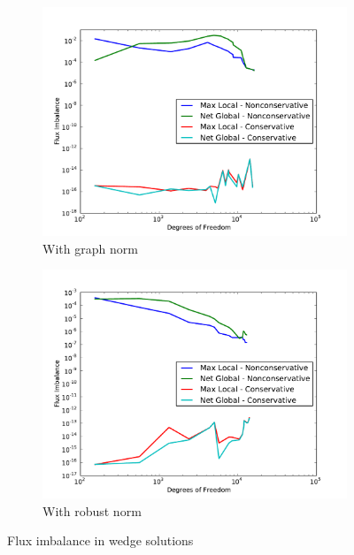 \documentclass[letterpaper]{article}
\begin{document}
\begin{figure}
\centering
\begin{subfigure}[t]{0.45\textwidth}
\centering
\includegraphics[width=\textwidth]{figs/Wedge/graphFlux.pdf}
\caption{With graph norm}
\label{fig:wedgeGraphFlux}
\end{subfigure}
\begin{subfigure}[t]{0.45\textwidth}
\centering
\includegraphics[width=\textwidth]{figs/Wedge/robustFlux.pdf}
\caption{With robust norm}
\label{fig:wedgeRobustFlux}
\end{subfigure}
\caption{Flux imbalance in wedge solutions}
\label{fig:wedge_flux}
\end{figure}



\end{document}

